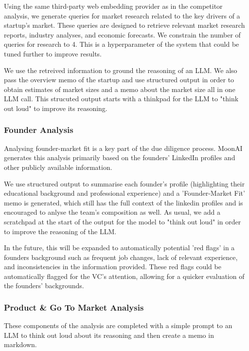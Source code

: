 \documentclass[a4paper, oneside]{discothesis}
\begin{document}
Using the same third-party web embedding provider as in the competitor analysis, we generate queries for market research related to the key drivers of a startup's market. These queries are designed to retrieve relevant market research reports, industry analyses, and economic forecasts. We constrain the number of queries for research to 4. This is a hyperparameter of the system that could be tuned further to improve results. 

We use the retreived information to ground the reasoning of an LLM. We also pass the overview memo of the startup and use structured output in order to obtain estimates of market sizes and a memo about the market size all in one LLM call. This strucuted output starts with a thinkpad for the LLM to "think out loud" to improve its reasoning.

\subsubsection{Founder Analysis}
Analysing founder-market fit is a key part of the due diligence process. MoonAI generates this analysis primarily based on the founders' LinkedIn profiles and other publicly available information. 

We use structured output to summarise each founder's profile (highlighting their educational background and professional experience) and  a 'Founder-Market Fit' memo is generated, which still has the full context of the linkedin profiles and is encouraged to anlyse the team's composition as well. As usual, we add a scratchpad at the start of the output for the model to "think out loud" in order to improve the reasoning of the LLM. 

In the future, this will be expanded to automatically potential 'red flags' in a founders background such as frequent job changes, lack of relevant experience, and inconsistencies in the information provided. These red flags could be automatically flagged for the VC's attention, allowing for a quicker evaluation of the founders' backgrounds.

\subsubsection{Product \& Go To Market Analysis}
These components of the analysis are completed with a simple prompt to an LLM to think out loud about its reasoning and then create a memo in markdown.
\end{document}
